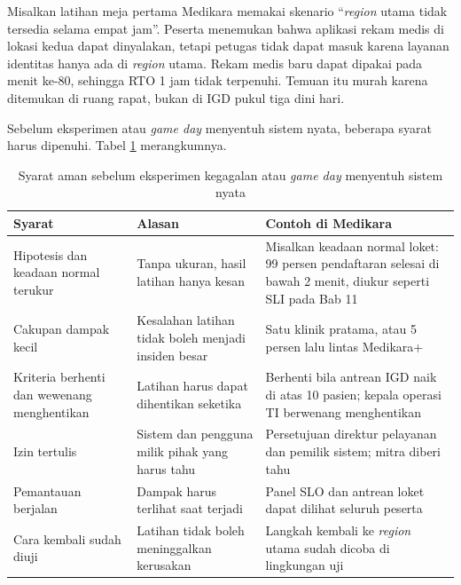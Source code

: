 Misalkan latihan meja pertama Medikara memakai skenario ``\textit{region} utama tidak tersedia
selama empat jam''. Peserta menemukan bahwa aplikasi rekam medis di lokasi kedua dapat dinyalakan,
tetapi petugas tidak dapat masuk karena layanan identitas hanya ada di \textit{region} utama.
Rekam medis baru dapat dipakai pada menit ke-80, sehingga RTO 1 jam tidak terpenuhi. Temuan itu
murah karena ditemukan di ruang rapat, bukan di IGD pukul tiga dini hari.

Sebelum eksperimen atau \textit{game day} menyentuh sistem nyata, beberapa syarat harus dipenuhi.
Tabel \ref{tab:ch12-syarat-aman} merangkumnya.

\begin{table}[!htb]
  \centering
  \caption{Syarat aman sebelum eksperimen kegagalan atau \textit{game day} menyentuh sistem nyata}
  \label{tab:ch12-syarat-aman}
  \footnotesize
  \begin{tabularx}{\textwidth}{>{\raggedright\arraybackslash}p{2.8cm} >{\raggedright\arraybackslash}X >{\raggedright\arraybackslash}X}
    \hline
    \textbf{Syarat} & \textbf{Alasan} & \textbf{Contoh di Medikara} \\ \hline
    Hipotesis dan keadaan normal terukur & Tanpa ukuran, hasil latihan hanya kesan &
      Misalkan keadaan normal loket: 99 persen pendaftaran selesai di bawah 2 menit, diukur seperti
      SLI pada Bab 11 \\ \hline
    Cakupan dampak kecil & Kesalahan latihan tidak boleh menjadi insiden besar & Satu klinik
      pratama, atau 5 persen lalu lintas Medikara+ \\ \hline
    Kriteria berhenti dan wewenang menghentikan & Latihan harus dapat dihentikan seketika &
      Berhenti bila antrean IGD naik di atas 10 pasien; kepala operasi TI berwenang menghentikan
      \\ \hline
    Izin tertulis & Sistem dan pengguna milik pihak yang harus tahu & Persetujuan direktur
      pelayanan dan pemilik sistem; mitra diberi tahu \\ \hline
    Pemantauan berjalan & Dampak harus terlihat saat terjadi & Panel SLO dan antrean loket dapat
      dilihat seluruh peserta \\ \hline
    Cara kembali sudah diuji & Latihan tidak boleh meninggalkan kerusakan & Langkah kembali ke
      \textit{region} utama sudah dicoba di lingkungan uji \\ \hline
  \end{tabularx}
\end{table}

